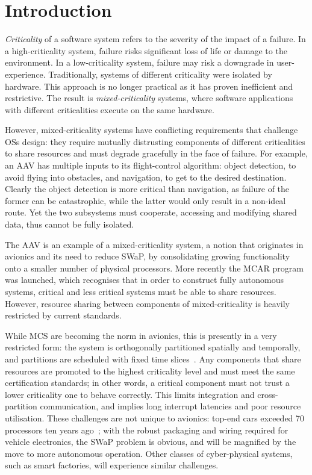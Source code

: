 \chapter{Introduction}

\emph{Criticality} of a software system refers to the severity of the impact of a failure.  In a
high-criticality system, failure risks significant loss of life or damage to the environment.  In a
low-criticality system, failure may risk a downgrade in user-experience.  Traditionally, systems of
different criticality were isolated by hardware.  This approach is no longer practical as it has
proven inefficient and restrictive.  The result is \emph{mixed-criticality} systems, where software
applications with different criticalities execute on the same hardware.

However, mixed-criticality systems have conflicting requirements that challenge \glspl{OS} design:
they require mutually distrusting components of different criticalities to share resources and must
degrade gracefully in the face of failure.  For example, an \gls{AAV} has multiple inputs to its
flight-control algorithm: object detection, to avoid flying into obstacles, and navigation, to get
to the desired destination.  Clearly the object detection is more critical than navigation, as
failure of the former can be catastrophic, while the latter would only result in a non-ideal route.
Yet the two subsystems must cooperate, accessing and modifying shared data, thus cannot be fully
isolated.

The \gls{AAV} is an example of a mixed-criticality system, a notion that originates in avionics and its
need to reduce \gls{SWaP}, by consolidating growing functionality onto a smaller
number of physical processors. More recently the
\gls{MCAR}\citep{Barhorst_BBHPSSSSU_09} program was launched, which recognises that in order to
construct fully autonomous systems, critical and less critical systems must be able to share
resources. However, resource sharing between components of mixed-criticality is heavily restricted by current
standards.

While MCS are becoming the norm in avionics, this is presently in a very restricted form: the system
is orthogonally partitioned spatially and temporally, and partitions are scheduled with fixed time
slices~\citep{ARINC653}. Any components that share resources are promoted to the highest criticality
level and must meet the same certification standards; in other words, a critical component must not
trust a lower criticality one to behave correctly. This limits integration and cross-partition
communication, and implies long interrupt latencies and poor resource utilisation. 
These challenges are not unique to avionics: top-end cars exceeded 70 processors ten years
ago~\citep{Broy_KPS_07}; with the robust packaging and wiring required for vehicle electronics, the
SWaP problem is obvious, and will be magnified by the move to more autonomous operation. Other
classes of cyber-physical systems, such as smart factories, will experience similar challenges.

